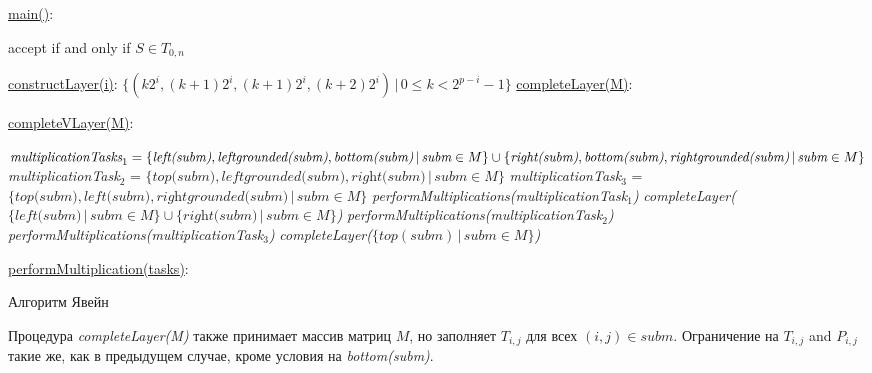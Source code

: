 \documentclass[14pt]{matmex-diploma-custom}
\begin{document}
\begin{algorithm}[!h]
\SetAlgoNoLine
{}
\underline{main()}{:}{

 accept if and only if $S \in T_{0, n}$
 \BlankLine
 }

\underline{constructLayer(i)}{:}{
 \BlankLine
 $\{(k2^i, (k+1)2^i, (k + 1)2^i, (k+2)2^i) \, |\, 0 \le k < 2^{p - i} - 1\}$
 \BlankLine
    }
\underline{completeLayer(M)}{:}{
\BlankLine
{}
\BlankLine
}

\underline{completeVLayer(M)}{:}{
 \BlankLine
 $\textit{multiplicationTasks}_1 = \linebreak
    \{\textit{left(subm)}, \textit{leftgrounded(subm)}, \textit{bottom(subm)}\, 
    |\,\textit{subm} \in M \} \cup \linebreak  \{\textit{right(subm)}, \textit{bottom(subm)}, \textit{rightgrounded(subm)}\, |\,\textit{subm} \in M\}$\;
 \BlankLine
 \textit{multiplicationTask$_2$} = $\{\textit{top(subm)}, \textit{leftgrounded(subm)}, \textit{right(subm)}\, |\,\textit{subm} \in M\}$\;
 \BlankLine
 \textit{multiplicationTask$_3$} = $\{\textit{top(subm)}, \textit{left(subm)}, \textit{rightgrounded(subm)}\, |\,\textit{subm} \in M\}$\;
 \BlankLine
 \textit{performMultiplications(multiplicationTask$_1$)}\;
 \textit{completeLayer($\{\textit{left(subm)}\, |\,subm \in M \} \cup \{\textit{right(subm)}\, |\,\textit{subm} \in M \}$)}\;
 \textit{performMultiplications(multiplicationTask$_2$)}\;
 \textit{performMultiplications(multiplicationTask$_3$)}\;
 \textit{completeLayer($\{top(subm)\, |\,subm \in M \}$)}

 }
 \BlankLine

 \underline{performMultiplication(tasks)}{:}{\\
 }

\caption{Алгоритм Явейн}
\label{algo:modified}
\end{algorithm}

Процедура \textit{completeLayer(M)} также принимает массив матриц $M$, но заполняет $T_{i, j}$ для всех $(i, j) \in subm$.
Ограничение на $T_{i, j}$  and $P_{i, j}$ такие же, как в предыдущем случае, кроме условия на \textit{bottom(subm)}.
\end{document}
